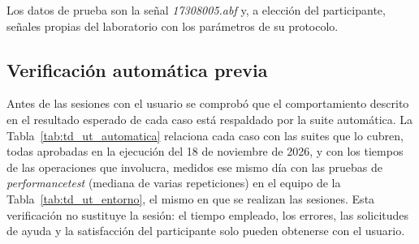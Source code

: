 \documentclass[12pt,letterpaper,oneside]{article}
\DeclareRobustCommand{\_}{\textunderscore\allowbreak}
\begin{document}
Los datos de prueba son la señal \textit{17308005.abf} y, a elección del participante, señales propias del laboratorio con los parámetros de su protocolo.

\subsection{Verificación automática previa}
\label{sec:td_ut_automatica}
Antes de las sesiones con el usuario se comprobó que el comportamiento descrito en el resultado esperado de cada caso está respaldado por la suite automática. La Tabla~\ref{tab:td_ut_automatica} relaciona cada caso con las suites que lo cubren, todas aprobadas en la ejecución del 18 de noviembre de 2026, y con los tiempos de las operaciones que involucra, medidos ese mismo día con las pruebas de \textit{performance\_test} (mediana de varias repeticiones) en el equipo de la Tabla~\ref{tab:td_ut_entorno}, el mismo en que se realizan las sesiones. Esta verificación no sustituye la sesión: el tiempo empleado, los errores, las solicitudes de ayuda y la satisfacción del participante solo pueden obtenerse con el usuario.
\end{document}

